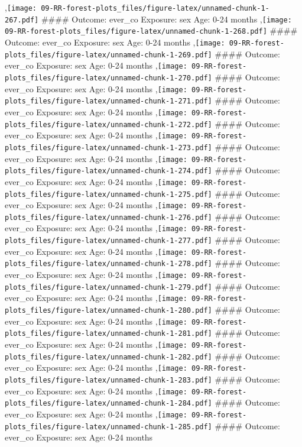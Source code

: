 \documentclass[
  9pt,
]{book}
\begin{document}
,\texttt{[image: 09-RR-forest-plots\_files/figure-latex/unnamed-chunk-1-267.pdf]}
\#\#\#\# Outcome: ever\_co Exposure: sex Age: 0-24 months
,\texttt{[image: 09-RR-forest-plots\_files/figure-latex/unnamed-chunk-1-268.pdf]}
\#\#\#\# Outcome: ever\_co Exposure: sex Age: 0-24 months
,\texttt{[image: 09-RR-forest-plots\_files/figure-latex/unnamed-chunk-1-269.pdf]}
\#\#\#\# Outcome: ever\_co Exposure: sex Age: 0-24 months
,\texttt{[image: 09-RR-forest-plots\_files/figure-latex/unnamed-chunk-1-270.pdf]}
\#\#\#\# Outcome: ever\_co Exposure: sex Age: 0-24 months
,\texttt{[image: 09-RR-forest-plots\_files/figure-latex/unnamed-chunk-1-271.pdf]}
\#\#\#\# Outcome: ever\_co Exposure: sex Age: 0-24 months
,\texttt{[image: 09-RR-forest-plots\_files/figure-latex/unnamed-chunk-1-272.pdf]}
\#\#\#\# Outcome: ever\_co Exposure: sex Age: 0-24 months
,\texttt{[image: 09-RR-forest-plots\_files/figure-latex/unnamed-chunk-1-273.pdf]}
\#\#\#\# Outcome: ever\_co Exposure: sex Age: 0-24 months
,\texttt{[image: 09-RR-forest-plots\_files/figure-latex/unnamed-chunk-1-274.pdf]}
\#\#\#\# Outcome: ever\_co Exposure: sex Age: 0-24 months
,\texttt{[image: 09-RR-forest-plots\_files/figure-latex/unnamed-chunk-1-275.pdf]}
\#\#\#\# Outcome: ever\_co Exposure: sex Age: 0-24 months
,\texttt{[image: 09-RR-forest-plots\_files/figure-latex/unnamed-chunk-1-276.pdf]}
\#\#\#\# Outcome: ever\_co Exposure: sex Age: 0-24 months
,\texttt{[image: 09-RR-forest-plots\_files/figure-latex/unnamed-chunk-1-277.pdf]}
\#\#\#\# Outcome: ever\_co Exposure: sex Age: 0-24 months
,\texttt{[image: 09-RR-forest-plots\_files/figure-latex/unnamed-chunk-1-278.pdf]}
\#\#\#\# Outcome: ever\_co Exposure: sex Age: 0-24 months
,\texttt{[image: 09-RR-forest-plots\_files/figure-latex/unnamed-chunk-1-279.pdf]}
\#\#\#\# Outcome: ever\_co Exposure: sex Age: 0-24 months
,\texttt{[image: 09-RR-forest-plots\_files/figure-latex/unnamed-chunk-1-280.pdf]}
\#\#\#\# Outcome: ever\_co Exposure: sex Age: 0-24 months
,\texttt{[image: 09-RR-forest-plots\_files/figure-latex/unnamed-chunk-1-281.pdf]}
\#\#\#\# Outcome: ever\_co Exposure: sex Age: 0-24 months
,\texttt{[image: 09-RR-forest-plots\_files/figure-latex/unnamed-chunk-1-282.pdf]}
\#\#\#\# Outcome: ever\_co Exposure: sex Age: 0-24 months
,\texttt{[image: 09-RR-forest-plots\_files/figure-latex/unnamed-chunk-1-283.pdf]}
\#\#\#\# Outcome: ever\_co Exposure: sex Age: 0-24 months
,\texttt{[image: 09-RR-forest-plots\_files/figure-latex/unnamed-chunk-1-284.pdf]}
\#\#\#\# Outcome: ever\_co Exposure: sex Age: 0-24 months
,\texttt{[image: 09-RR-forest-plots\_files/figure-latex/unnamed-chunk-1-285.pdf]}
\#\#\#\# Outcome: ever\_co Exposure: sex Age: 0-24 months
\end{document}
